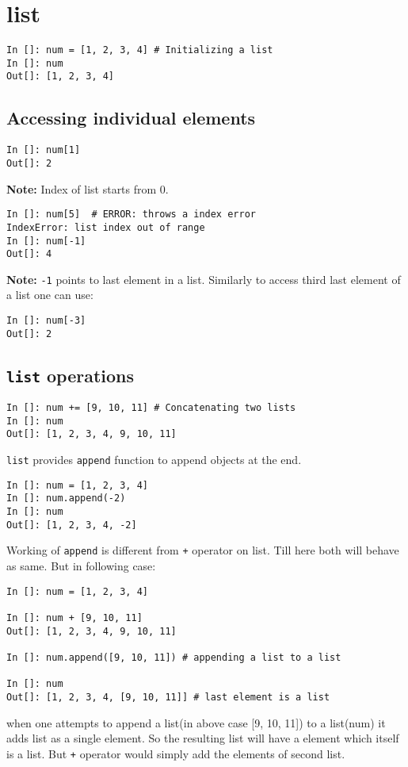\documentclass[12pt]{article}
\newcommand{\typ}[1]{\lstinline{#1}}
\begin{document}
\section{list}
\begin{lstlisting}
In []: num = [1, 2, 3, 4] # Initializing a list
In []: num
Out[]: [1, 2, 3, 4]
\end{lstlisting}
\subsection{Accessing individual elements}
\begin{lstlisting}
In []: num[1]
Out[]: 2  
\end{lstlisting}
\textbf{Note:} Index of list starts from 0.
\begin{lstlisting}
In []: num[5]  # ERROR: throws a index error
IndexError: list index out of range
In []: num[-1]
Out[]: 4
\end{lstlisting}
\textbf{Note: }\typ{-1} points to last element in a list. Similarly to access third last element of a list one can use: 
\begin{lstlisting}
In []: num[-3]
Out[]: 2  
\end{lstlisting}
\subsection{\typ{list} operations}
\begin{lstlisting}
In []: num += [9, 10, 11] # Concatenating two lists
In []: num
Out[]: [1, 2, 3, 4, 9, 10, 11]
\end{lstlisting}
\typ{list} provides \typ{append} function to append objects at the end. 
\begin{lstlisting}
In []: num = [1, 2, 3, 4] 
In []: num.append(-2) 
In []: num
Out[]: [1, 2, 3, 4, -2]
\end{lstlisting}
Working of \typ{append} is different from \typ{+} operator on list. Till here both will behave as same. But in following case:
\begin{lstlisting}
In []: num = [1, 2, 3, 4]

In []: num + [9, 10, 11]
Out[]: [1, 2, 3, 4, 9, 10, 11]

In []: num.append([9, 10, 11]) # appending a list to a list

In []: num
Out[]: [1, 2, 3, 4, [9, 10, 11]] # last element is a list
\end{lstlisting}
when one attempts to append a list(in above case [9, 10, 11]) to a list(num) it adds list as a single element. So the resulting list will have a element which itself is a list. But \typ{+} operator would simply add the elements of second list.\\
\end{document}
